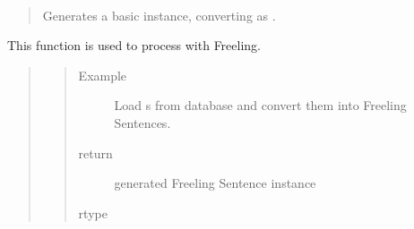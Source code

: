 \documentclass[letterpaper,10pt,english]{sphinxmanual}
\begin{document}
\begin{fulllineitems}
\begin{quote}
\begin{description}
\begin{itemize}
\end{itemize}

\end{description}\end{quote}

\begin{fulllineitems}
\label{\detokenize{index:loacore.classes.classes.Sentence.compute_freeling_sentence}}~\begin{quote}

Generates a basic  instance, converting  as  .
\end{quote}

This function is used to process {\hyperref[\detokenize{index:loacore.classes.classes.Sentence}]{}} with Freeling.
\begin{quote}
\begin{quote}\begin{description}
\item[{Example}] \leavevmode
Load {\hyperref[\detokenize{index:loacore.classes.classes.Sentence}]{}} s from database and convert them into Freeling Sentences.

%
\begin{sphinxVerbatim}[commandchars=\\\{\}]
   
  
  \PYG{p}{[}    \PYG{p}{]}
\end{sphinxVerbatim}

\item[{return}] \leavevmode
generated Freeling Sentence instance

\item[{rtype}] \leavevmode
{}


\end{description}
\end{quote}
\end{quote}
\end{fulllineitems}
\end{fulllineitems}
\end{document}
